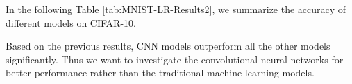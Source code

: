 In the following Table \ref{tab:MNIST-LR-Results2}, we summarize the accuracy of different models on CIFAR-10.

Based on the previous results, CNN models outperform all the other models significantly. 
Thus we want to investigate the convolutional neural networks for better performance rather than the traditional machine learning models. 
